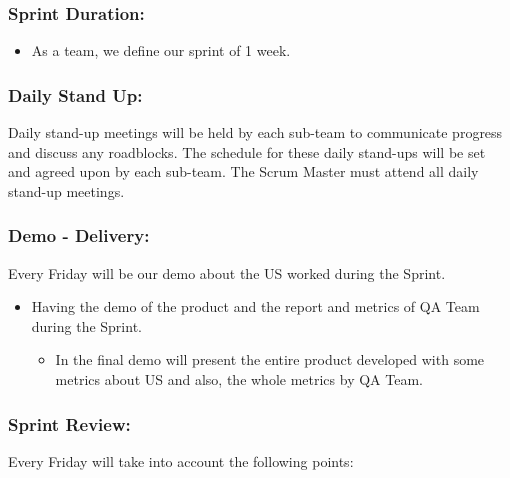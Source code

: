 \hypertarget{sprintduration}{
\subsubsection{\texorpdfstring{\textbf{Sprint
Duration:}}{Sprint Duration:}}\label{sprintduration}}

\begin{itemize}
\tightlist
\item
  As a team, we define our sprint of 1 week.
\end{itemize}

\hypertarget{dailystandup}{
\subsubsection{Daily Stand Up:}\label{dailystandup}}

Daily stand-up meetings will be held by each sub-team to communicate
progress and discuss any roadblocks. The schedule for these daily
stand-ups will be set and agreed upon by each sub-team. The Scrum Master
must attend all daily stand-up meetings.

\hypertarget{demodelivery}{
\subsubsection{Demo - Delivery:}\label{demodelivery}}

Every Friday will be our demo about the US worked during the Sprint.

\begin{itemize}
\tightlist
\item
  Having the demo of the product and the report and metrics of QA Team
  during the Sprint.

  \begin{itemize}
  \tightlist
  \item
    In the final demo will present the entire product developed with
    some metrics about US and also, the whole metrics by QA Team.
  \end{itemize}
\end{itemize}

\hypertarget{sprintreview}{
\subsubsection{Sprint Review:}\label{sprintreview}}

Every Friday will take into account the following points:

